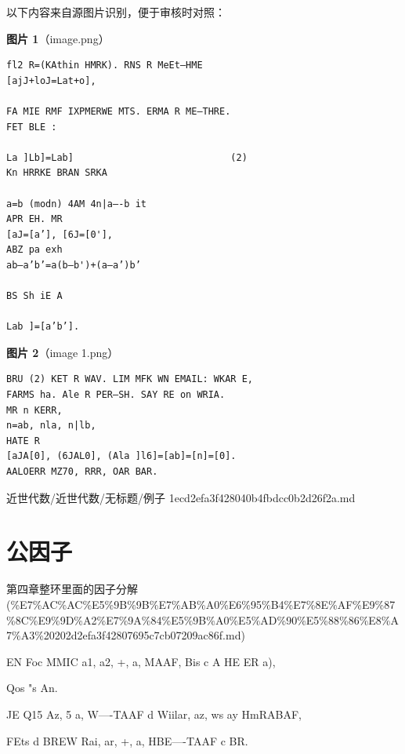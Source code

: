\begin{note}
以下内容来自源图片识别，便于审核时对照：

\textbf{图片 1}（image.png）
\begin{Verbatim}[fontsize=\small]
fl2 R=(KAthin HMRK). RNS R MeEt—HME
[ajJ+loJ=Lat+o],

FA MIE RMF IXPMERWE MTS. ERMA R ME—THRE.
FET BLE :

La ]Lb]=Lab]                            (2)
Kn HRRKE BRAN SRKA

a=b (modn) 4AM 4n|a—-b it
APR EH. MR
[aJ=[a’], [6J=[0'],
ABZ pa exh
ab—a’b’=a(b—b')+(a—a’)b’

BS Sh iE A

Lab ]=[a’b’].
\end{Verbatim}

\textbf{图片 2}（image 1.png）
\begin{Verbatim}[fontsize=\small]
BRU (2) KET R WAV. LIM MFK WN EMAIL: WKAR E,
FARMS ha. Ale R PER—SH. SAY RE on WRIA.
MR n KERR,
n=ab, nla, n|lb,
HATE R
[aJA[0], (6JAL0], (Ala ]l6]=[ab]=[n]=[0].
AALOERR MZ70, RRR, OAR BAR.
\end{Verbatim}

\end{note}

\begin{note}[来源路径]

近世代数/近世代数/无标题/例子 1ecd2efa3f428040b4fbdcc0b2d26f2a.md

\end{note}

\section*{公因子}

\begin{note}[来源上级主题]

第四章整环里面的因子分解 (\%E7\%AC\%AC\%E5\%9B\%9B\%E7\%AB\%A0\%E6\%95\%B4\%E7\%8E\%AF\%E9\%87\%8C\%E9\%9D\%A2\%E7\%9A\%84\%E5\%9B\%A0\%E5\%AD\%90\%E5\%88\%86\%E8\%A7\%A3\%20202d2efa3f42807695c7cb07209ac86f.md)

\end{note}

\begin{note}[公因子]

EN Foc MMIC a1, a2, +, a, MAAF, Bis c A HE ER a),

Qos "s An.

JE Q15 Az, 5 a, W—-TAAF d Wiilar, az, ws ay HmRABAF,

FEts d BREW Rai, ar, +, a, HBE—-TAAF c BR.

\end{note}

